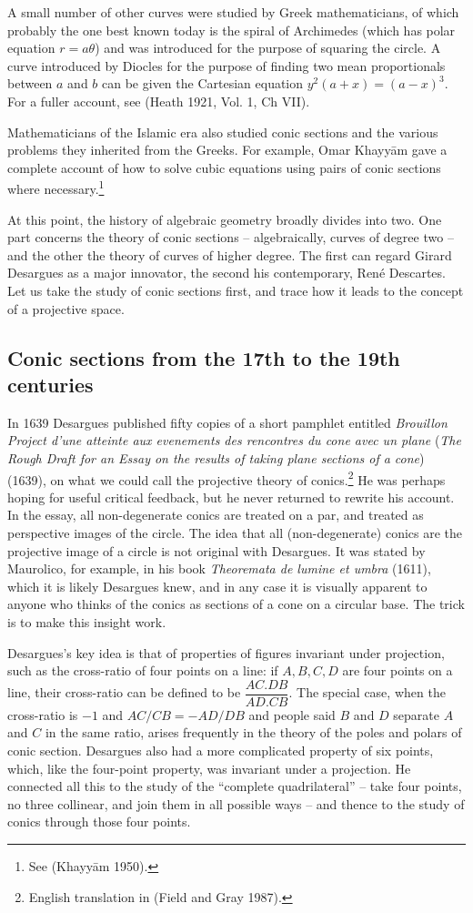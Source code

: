 \documentclass[11pt]{article}
\begin{document}
A small number of other curves were studied by Greek mathematicians, of which probably the one best known today is the spiral of Archimedes (which has polar equation $r = a \theta$) and was introduced for the purpose of squaring the circle. A curve introduced by Diocles for the purpose of finding two mean proportionals between $a$ and $b$ can be given the Cartesian equation $y^2 (a + x) = (a-x)^3.$ For a fuller account, see (Heath 1921, Vol. 1, Ch VII). 

Mathematicians of the Islamic era also studied conic sections and the various problems they inherited from the Greeks. For example, Omar Khayy\={a}m gave a complete account of how to solve cubic equations using pairs of conic sections where necessary.\footnote{See (Khayy\={a}m 1950).}

At this point, the history of algebraic geometry broadly divides into two. One part concerns the theory of conic sections -- algebraically, curves of degree two -- and the other the theory of curves of higher degree. The first can regard Girard Desargues as a major innovator, the second his contemporary,  Ren\'e Descartes. Let us take the study of conic sections first, and trace how it leads to the concept of a projective space.


\subsection{Conic sections from the 17th to the 19th centuries}
In 1639 Desargues published fifty copies of a short pamphlet entitled \emph{Brouillon Project d'une atteinte aux evenements des rencontres du cone avec un plane} (\emph{The Rough Draft for an Essay on the results of taking plane sections of a cone}) (1639), on what we could call the projective theory of conics.\footnote{English translation in (Field and Gray 1987).} He was perhaps hoping for useful critical feedback, but he never returned to rewrite his account.  In the essay, all non-degenerate conics are treated on a par, and treated as perspective images of the circle. The idea that all (non-degenerate) conics are the projective image of a circle is not original with Desargues. It was stated by Maurolico, for example, in his book \emph{Theoremata de lumine et umbra} (1611), which it is likely Desargues knew, and in any case it is visually apparent to anyone who thinks of the conics as sections of a cone on a circular base. The trick is to make this insight work.

Desargues's key idea is that of properties of figures invariant under projection, such as the cross-ratio of four points on a line: if $A,  B, C, D$ are four points on a line, their cross-ratio can be defined to be
$\dfrac{AC.DB}{AD.CB}$. The special case,  when the cross-ratio is $-1$ and $AC/CB=-AD/DB$ and people said $B$ and $D$ separate $A$ and $C$ in the same ratio, arises frequently in the theory of the poles and polars of conic section. Desargues also had a more complicated property of six points, which, like the four-point property, was invariant under a projection. He connected all this to the study of the ``complete quadrilateral'' -- take four points, no three collinear, and join them in all possible ways --  and thence to the study of conics through those four points. 
\end{document}

